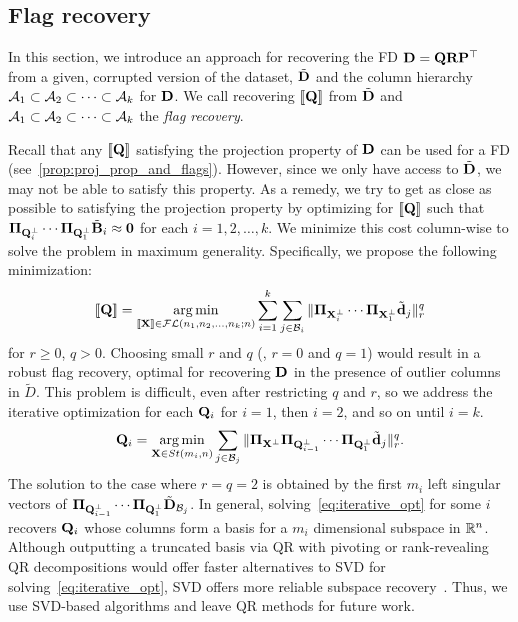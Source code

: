 \subsection{Flag recovery}
In this section, we introduce an approach for recovering the FD $\mathbf{D} = \mathbf{Q} \mathbf{R} \mathbf{P}^\top$ from a given, corrupted version of the dataset, $\tilde{\mathbf{D}}$ and the column hierarchy $\mathcal{A}_1 \subset \mathcal{A}_2 \subset \cdots \subset \mathcal{A}_k$ for $\mathbf{D}$. We call recovering $[\![ \mathbf{Q} ]\!]$ from $\tilde{\mathbf{D}}$ and $\mathcal{A}_1 \subset \mathcal{A}_2 \subset \cdots \subset \mathcal{A}_k$ the \emph{flag recovery}.


Recall that any $[\![ \mathbf{Q} ]\!]$ satisfying the projection property of $\mathbf{D}$ can be used for a FD (see~\cref{prop:proj_prop_and_flags}). However, since we only have access to $\tilde{\mathbf{D}}$, we may not be able to satisfy this property. As a remedy, we try to get as close as possible to satisfying the projection property by optimizing for $[\![\mathbf{Q}]\!]$ such that $\boldsymbol{\Pi}_{\mathbf{Q}_i^\perp} \cdots \boldsymbol{\Pi}_{\mathbf{Q}_1^\perp}\tilde{\mathbf{B}}_i \approx \bm{0}$ for each $i=1,2,\dots,k$. We minimize this cost column-wise to solve the problem in maximum generality. Specifically, we propose the following minimization:
\begin{equation}\label{eq:general_opt}
    [\![\mathbf{Q}]\!] = \operatorname*{arg\min}_{[\![\mathbf{X}]\!] \in \mathcal{FL}(n_1,n_2, \dots, n_k;n)} \sum_{i=1}^k \sum_{j \in \mathcal{B}_i}\| \boldsymbol{\Pi}_{\mathbf{X}_i^\perp} \cdots \boldsymbol{\Pi}_{\mathbf{X}_1^\perp} \tilde{\mathbf{d}}_j \|_r^q
\end{equation}
for $r\geq 0$, $q > 0$. Choosing small $r$ and $q$ (\eg, $r =0$ and $q=1$) would result in a robust flag recovery, optimal for recovering $\mathbf{D}$ in the presence of outlier columns in $\tilde{D}$. This problem is difficult, even after restricting $q$ and $r$, so we address the iterative optimization for each $\mathbf{Q}_i$ for $i=1$, then $i=2$, and so on until $i=k$.
\begin{equation}\label{eq:iterative_opt}
    \mathbf{Q}_i =  \operatorname*{arg\min}_{\mathbf{X} \in St(m_i,n)} \sum_{j \in \mathcal{B}_j}\| \boldsymbol{\Pi}_{\mathbf{X}^\perp} \boldsymbol{\Pi}_{\mathbf{Q}^\perp_{i-1}} \cdots \boldsymbol{\Pi}_{\mathbf{Q}^\perp_1} \tilde{\mathbf{d}}_j \|_r^q.
\end{equation}
The solution to the case where $r=q=2$ is obtained by the first $m_i$ left singular vectors of $\boldsymbol{\Pi}_{\mathbf{Q}^\perp_{i-1}} \cdots \boldsymbol{\Pi}_{\mathbf{Q}^\perp_1} \tilde{\mathbf{D}}_{\mathcal{B}_j}$.
In general, solving~\cref{eq:iterative_opt} for some $i$ recovers $\mathbf{Q}_i$ whose columns form a basis for a $m_i$ dimensional subspace in $\mathbb{R}^n$.
Although outputting a truncated basis via QR with pivoting or rank-revealing QR decompositions would offer faster alternatives to SVD for solving~\cref{eq:iterative_opt}, SVD offers more reliable subspace recovery~\cite{demmel1997applied}. Thus, we use SVD-based algorithms and leave QR methods for future work.

